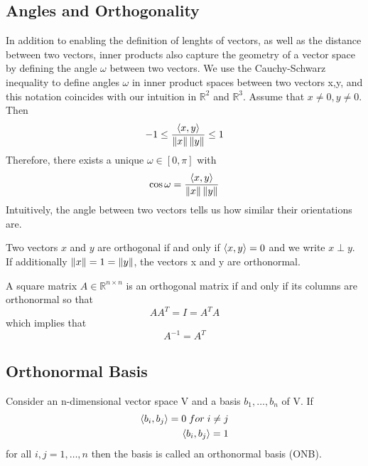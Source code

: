 \subsection{Angles and Orthogonality}
In addition to enabling the definition of lenghts of vectors, as well as the distance between two vectors, inner products also capture the geometry of a vector space by defining the angle $\omega$ between two vectors. We use the Cauchy-Schwarz inequality to define angles $\omega$ in inner product spaces between two vectors x,y, and this notation coincides with our intuition in $\mathbb{R}^2$ and $\mathbb{R}^3$. Assume that $x \neq 0, y\neq 0$. Then 
\[ 
    -1 \leq \frac{\left\langle x,y\right\rangle}{\left\lVert x\right\rVert\left\lVert y\right\rVert} \leq 1 
\]
Therefore, there exists a unique $\omega \in [0,\pi]$ with 
\[ 
    \cos{\omega} = \frac{\left\langle x,y\right\rangle}{\left\lVert x\right\rVert\left\lVert y\right\rVert}
\]Intuitively, the angle between two vectors tells us how similar their orientations are.
\begin{definition}[Orthogonality]
    Two vectors $x$ and $y$ are orthogonal if and only if $\left\langle x,y\right\rangle = 0$ and we write $x \perp y$. If additionally $\left\lVert x\right\rVert = 1 = \left\lVert y\right\rVert$, the vectors x and y are orthonormal.
\end{definition}
\begin{definition}
    A square matrix $A \in \mathbb{R}^{n\times n}$ is an orthogonal matrix if and only if its columns are orthonormal so that 
    \[ 
        AA^T = I = A^TA 
    \]which implies that
    \[ 
        A^{-1} = A^T 
    \]
\end{definition}
\subsection{Orthonormal Basis}
\begin{definition}
    Consider an n-dimensional vector space V and a basis $b_{1}, \ldots,b_{n}$ of V. If 
    \begin{align*}
        \left\langle b_i,b_j\right\rangle = 0 \; for \; i\neq j \\
        \left\langle b_i,b_j\right\rangle = 1
    \end{align*}
    for all $i,j = 1, \ldots, n$ then the basis is called an orthonormal basis (ONB).
\end{definition}
